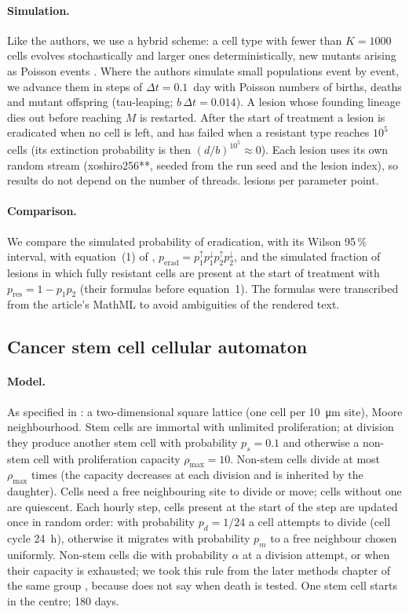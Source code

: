 \documentclass[11pt]{article}
\begin{document}
\paragraph{Simulation.} Like the authors, we use a hybrid scheme: a cell type with fewer than
$K=1000$ cells evolves stochastically and larger ones deterministically, new mutants
arising as Poisson events \cite{bozic2013}. Where the authors simulate small populations
event by event, we advance them in steps of $\Delta t=0.1$~day with Poisson numbers of
births, deaths and mutant offspring (tau-leaping; $b\,\Delta t = 0.014$). A lesion whose
founding lineage dies out before reaching $M$ is restarted. After the start of treatment a
lesion is eradicated when no cell is left, and has failed when a resistant type reaches
$10^5$ cells (its extinction probability is then $(d/b)^{10^5}\approx 0$). Each lesion uses
its own random stream (xoshiro256**, seeded from the run seed and the lesion index), so
results do not depend on the number of threads. \BozicLesions{} lesions per parameter
point.

\paragraph{Comparison.} We compare the simulated probability of eradication, with its
Wilson 95\,\% interval, with equation~(1) of \cite{bozic2013},
$p_{\mathrm{erad}} = p_1^{\uparrow} p_1^{\downarrow} p_2^{\uparrow} p_2^{\downarrow}$, and the
simulated fraction of lesions in which fully resistant cells are present at the start of
treatment with $p_{\mathrm{res}} = 1-p_1 p_2$ (their formulas before equation~1). The
formulas were transcribed from the article's MathML to avoid ambiguities of the rendered
text.

\subsection{Cancer stem cell cellular automaton}
\paragraph{Model.} As specified in \cite{poleszczuk2014}: a two-dimensional square lattice
(one cell per \SI{10}{\micro\meter} site), Moore neighbourhood. Stem cells are immortal with
unlimited proliferation; at division they produce another stem cell with probability
$p_s=0.1$ and otherwise a non-stem cell with proliferation capacity $\rho_{\max}=10$.
Non-stem cells divide at most $\rho_{\max}$ times (the capacity decreases at each division
and is inherited by the daughter). Cells need a free neighbouring site to divide or move;
cells without one are quiescent. Each hourly step, cells present at the start of the step
are updated once in random order: with probability $p_d=1/24$ a cell attempts to divide
(cell cycle 24~h), otherwise it migrates with probability $p_m$ to a free neighbour chosen
uniformly. Non-stem cells die with probability $\alpha$ at a division attempt, or when
their capacity is exhausted; we took this rule from the later methods chapter of the same
group \cite{poleszczuk2016}, because \cite{poleszczuk2014} does not say when death is
tested. One stem cell starts in the centre; 180 days.
\end{document}
